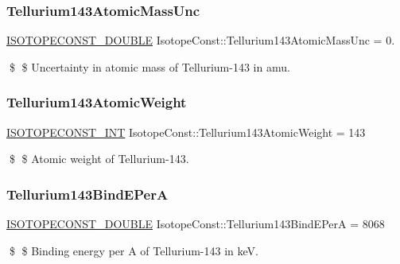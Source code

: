 \subsubsection{\texorpdfstring{Tellurium143\+Atomic\+Mass\+Unc}{Tellurium143AtomicMassUnc}}
{\footnotesize\ttfamily \mbox{\hyperlink{group___isotope_const-_macros_ga8f45a7272ce02c0b4c65c44636ed719a}{I\+S\+O\+T\+O\+P\+E\+C\+O\+N\+S\+T\+\_\+\+D\+O\+U\+B\+LE}} Isotope\+Const\+::\+Tellurium143\+Atomic\+Mass\+Unc = 0.}

\$ \$ Uncertainty in atomic mass of Tellurium-\/143 in amu. \mbox{\label{group___isotope_const-_tellurium-_te143_gab4c74eeec130a31a7ee6587a61f4ee6c}} 
\subsubsection{\texorpdfstring{Tellurium143\+Atomic\+Weight}{Tellurium143AtomicWeight}}
{\footnotesize\ttfamily \mbox{\hyperlink{group___isotope_const-_macros_ga5f18360b3e99483a35c32d789e62621c}{I\+S\+O\+T\+O\+P\+E\+C\+O\+N\+S\+T\+\_\+\+I\+NT}} Isotope\+Const\+::\+Tellurium143\+Atomic\+Weight = 143}

\$ \$ Atomic weight of Tellurium-\/143. \mbox{\label{group___isotope_const-_tellurium-_te143_ga01dbb2d27ef5319a2cf22df618224dcb}} 
\subsubsection{\texorpdfstring{Tellurium143\+Bind\+E\+PerA}{Tellurium143BindEPerA}}
{\footnotesize\ttfamily \mbox{\hyperlink{group___isotope_const-_macros_ga8f45a7272ce02c0b4c65c44636ed719a}{I\+S\+O\+T\+O\+P\+E\+C\+O\+N\+S\+T\+\_\+\+D\+O\+U\+B\+LE}} Isotope\+Const\+::\+Tellurium143\+Bind\+E\+PerA = 8068}

\$ \$ Binding energy per A of Tellurium-\/143 in keV. \mbox{\label{group___isotope_const-_tellurium-_te143_gab4f5138dba9b04bc97ff36404bff90c2}} 
